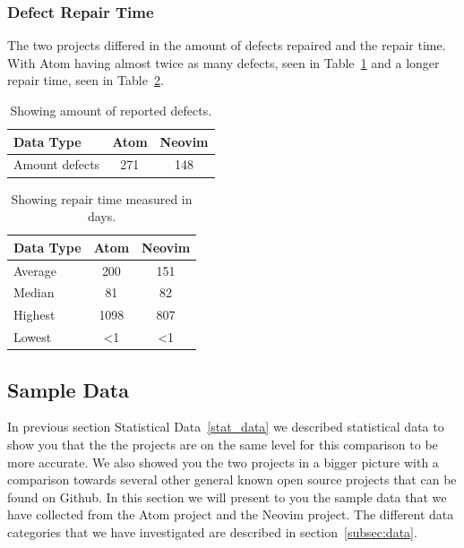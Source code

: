 \documentclass[a4paper,11pt]{article}
\begin{document}
{\FloatBarrier
\subsubsection{Defect Repair Time}
The two projects differed in the amount of defects repaired and the repair time. With Atom having almost twice as many defects, seen in Table~\ref{tab:defects} and a longer repair time, seen in Table~\ref{tab:repair_times}.
\begin{table}[h]
	\centering
	\begin{tabular}{ | l | c | c |}
		\hline
		\textbf{Data Type} 	& \textbf{Atom} 	& \textbf{Neovim}	\\\hline
		Amount defects		& 271		& 148		 	\\
		\hline
	\end{tabular}
	\caption{Showing amount of reported defects.}
	\label{tab:defects}
\end{table}

\begin{table}[h]
	\centering
	\begin{tabular}{ | l | c | c |}
		\hline
		\textbf{Data Type} 	& \textbf{Atom} 	& \textbf{Neovim}	\\\hline
		Average 			& 200 		& 151 			\\\hline
		Median	 		& 81			& 82 				\\\hline
		Highest			& 1098		& 807			\\\hline
		Lowest			& <1			& <1		 		\\
		\hline
	\end{tabular}
	\caption{Showing repair time measured in days.}
	\label{tab:repair_times}
\end{table}

\FloatBarrier
\subsection{Sample Data}
In previous section Statistical Data~\ref{stat_data} we described statistical data to show you that the the projects are on the same level for this comparison to be more accurate. We also showed you the two projects in a bigger picture with a comparison towards several other general known open source projects that can be found on Github.
In this section we will present to you the sample data that we have collected from the Atom project and the Neovim project. The different data categories that we have investigated are described in section~\ref{subsec:data}.

}
\end{document}
